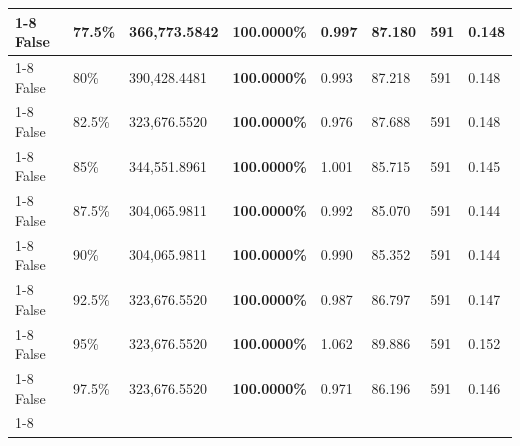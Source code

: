 \begin{table}[H]
\begin{tabular}{lllrllll}
\cline{1-8} \cline{2-8}
False & 77.5\% & 366,773.5842 & \bfseries \color{red} 100.0000\% & 0.997 & 87.180 & 591 & 0.148 \\
\cline{1-8} \cline{2-8}
False & 80\% & 390,428.4481 & \bfseries \color{red} 100.0000\% & 0.993 & 87.218 & 591 & 0.148 \\
\cline{1-8} \cline{2-8}
False & 82.5\% & 323,676.5520 & \bfseries \color{red} 100.0000\% & 0.976 & 87.688 & 591 & 0.148 \\
\cline{1-8} \cline{2-8}
False & 85\% & 344,551.8961 & \bfseries \color{red} 100.0000\% & 1.001 & 85.715 & 591 & 0.145 \\
\cline{1-8} \cline{2-8}
False & 87.5\% & \color{red} 304,065.9811 & \bfseries \color{red} 100.0000\% & 0.992 & 85.070 & 591 & 0.144 \\
\cline{1-8} \cline{2-8}
False & 90\% & \color{red} 304,065.9811 & \bfseries \color{red} 100.0000\% & 0.990 & 85.352 & 591 & 0.144 \\
\cline{1-8} \cline{2-8}
False & 92.5\% & 323,676.5520 & \bfseries \color{red} 100.0000\% & 0.987 & 86.797 & 591 & 0.147 \\
\cline{1-8} \cline{2-8}
False & 95\% & 323,676.5520 & \bfseries \color{red} 100.0000\% & 1.062 & 89.886 & 591 & 0.152 \\
\cline{1-8} \cline{2-8}
False & 97.5\% & 323,676.5520 & \bfseries \color{red} 100.0000\% & 0.971 & 86.196 & 591 & 0.146 \\
\cline{1-8} \cline{2-8}
\bottomrule
\end{tabular}
\end{table}
